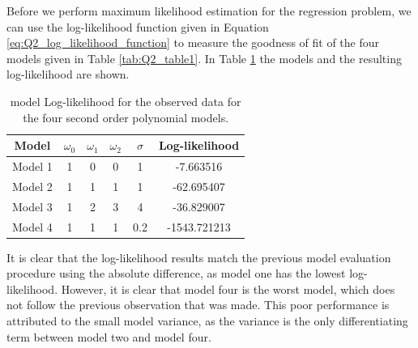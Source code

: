 \documentclass{article}
\begin{document}
Before we perform maximum likelihood estimation for the regression problem, we can use the log-likelihood function given in Equation \eqref{eq:Q2_log_likelihood_function} to measure the goodness of fit of the four models given in Table \ref{tab:Q2_table1}. In Table \ref{tab:Q2_table2} the models and the resulting log-likelihood are shown.
\begin{table}[!htb]
\centering
\caption{model Log-likelihood for the observed data for the four second order polynomial models.}
\label{tab:Q2_table2}
\begin{tabular}{@{}cccccc@{}}
\toprule
Model & $\omega_0$ & $\omega_1$ & $\omega_2$ & $\sigma$ & Log-likelihood \\ \midrule
Model 1 & 1 & 0 & 0 & 1 & -7.663516 \\
Model 2 & 1 & 1 & 1 & 1 & -62.695407 \\
Model 3 & 1 & 2 & 3 & 4 & -36.829007 \\
Model 4 & 1 & 1 & 1 & 0.2 & -1543.721213 \\ \bottomrule
\end{tabular}
\end{table}
It is clear that the log-likelihood results match the previous model evaluation procedure using the absolute difference, as model one has the lowest log-likelihood. However, it is clear that model four is the worst model, which does not follow the previous observation that was made. This poor performance is attributed to the small model variance, as the variance is the only differentiating term between model two and model four. 
\end{document}
